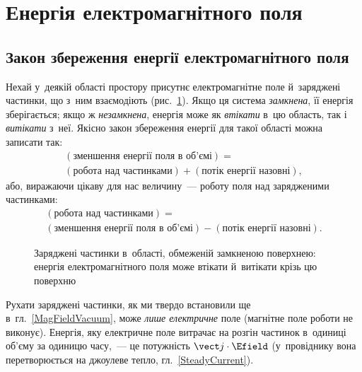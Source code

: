 \section{Енергія електромагнітного поля}\label{sec:PintingTheoreme}\hypertarget{em-field-energy}{}


\subsection*{Закон збереження енергії електромагнітного поля}


Нехай у~деякій області простору присутнє електромагнітне поле й~заряджені частинки, що
з~ним взаємодіють (рис.~\ref{pic:EnergyFlowRegion}). Якщо ця система \emph{замкнена}, її
енергія зберігається; якщо ж \emph{незамкнена}, енергія може як \emph{втікати} в~цю
область, так і \emph{витікати} з~неї. Якісно закон збереження енергії для такої області
можна записати так:
\begin{multline*}
	(\text{зменшення енергії поля в об'ємі}) = \\  (\text{робота над частинками}) + (\text{потік енергії назовні}),
\end{multline*}
або, виражаючи цікаву для нас величину~--- роботу поля над зарядженими частинками:
\begin{multline*}
	(\text{робота над частинками}) =  \\(\text{зменшення енергії поля в об'ємі}) - (\text{потік енергії назовні}).
\end{multline*}

\begin{figure}\centering
	\caption{Заряджені частинки в~області, обмеженій замкненою поверхнею: енергія
	електромагнітного поля може втікати й~витікати крізь цю
	поверхню\label{pic:EnergyFlowRegion}}
\end{figure}

Рухати заряджені частинки, як ми твердо встановили ще в~гл.~\ref{MagFieldVacuum}, може
\emph{лише електричне} поле (магнітне поле роботи не виконує). Енергія, яку електричне
поле витрачає на розгін частинок в~одиниці об'єму за одиницю часу,~--- це потужність
$\vect j\cdot\Efield$ (у~провіднику вона перетворюється на джоулеве тепло,
гл.~\ref{SteadyCurrent}).


